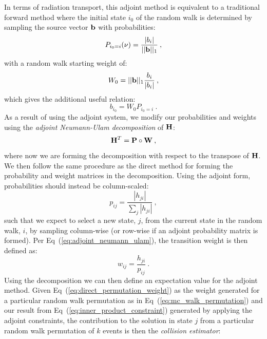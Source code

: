 In terms of radiation transport, this adjoint method is equivalent to
a traditional forward method where the initial state $i_0$ of the
random walk is determined by sampling the source vector $\mathbf{b}$ with
probabilities:
\begin{equation}
  P_{i_0=i}(\nu) = \frac{|b_i|}{||\mathbf{b}||_1}\:,
  \label{eq:adjoint_source_probability}
\end{equation}
with a random walk starting weight of:
\begin{equation}
  W_0 = ||\mathbf{b}||_1 \frac{b_i}{|b_i|}\:,
  \label{eq:adjoint_starting_weight}
\end{equation}
which gives the additional useful relation:
\begin{equation}
  b_{i_0} = W_0 P_{i_0=i}\:.
  \label{eq:adjoint_source_definition}
\end{equation}
As a result of using the adjoint system, we modify our probabilities
and weights using the \textit{adjoint Neumann-Ulam decomposition} of
$\mathbf{H}$:
\begin{equation}
  \mathbf{H}^{T} = \mathbf{P} \circ \mathbf{W}\:,
  \label{eq:adjoint_neumann_ulam}
\end{equation}
where now we are forming the decomposition with respect to the
transpose of $\mathbf{H}$. We then follow the same procedure as the direct
method for forming the probability and weight matrices in the
decomposition. Using the adjoint form, probabilities should instead be
column-scaled:
\begin{equation}
  p_{ij} = \frac{|h_{ji}|}{\sum_j |h_{ji}|}\:,
  \label{eq:adjoint_probability}
\end{equation}
such that we expect to select a new state, $j$, from the current state
in the random walk, $i$, by sampling column-wise (or row-wise if an
adjoint probability matrix is formed). Per
Eq~(\ref{eq:adjoint_neumann_ulam}), the transition weight is then
defined as:
\begin{equation}
  w_{ij} = \frac{h_{ji}}{p_{ij}}\:.
  \label{eq:adjoint_weight}
\end{equation}
Using the decomposition we can then define an expectation value for
the adjoint method. Given Eq~(\ref{eq:direct_permutation_weight}) as
the weight generated for a particular random walk permutation as in
Eq~(\ref{eq:mc_walk_permutation}) and our result from
Eq~(\ref{eq:inner_product_constraint}) generated by applying the
adjoint constraints, the contribution to the solution in state $j$
from a particular random walk permutation of $k$ events is then the
\textit{collision estimator}:

